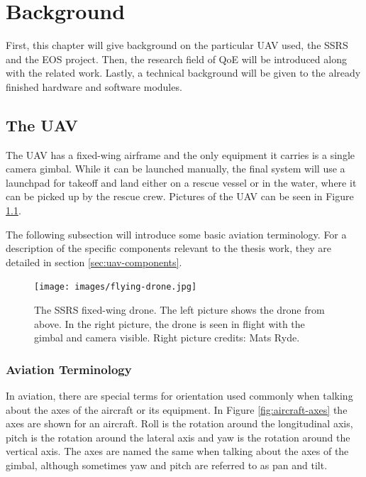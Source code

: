 \documentclass[nofilelist]{cslthse-msc}
\begin{document}
\chapter{Background}
First, this chapter will give background on the particular UAV used, the SSRS and the EOS project. Then, the research field of QoE will be introduced along with the related work. Lastly, a technical background will be given to the already finished hardware and software modules.  

\section{The UAV}
\label{sec:fixed-wing-uav}
The UAV has a fixed-wing airframe and the only equipment it carries is a single camera gimbal. While it can be launched manually, the final system will use a launchpad for takeoff and land either on a rescue vessel or in the water, where it can be picked up by the rescue crew. Pictures of the UAV can be seen in Figure \ref{fig:fv-drone-pics}. 

The following subsection will introduce some basic aviation terminology. For a description of the specific components relevant to the thesis work, they are detailed in section \ref{sec:uav-components}.

\begin{figure}[htp]
   \centering
   \texttt{[image: images/flying-drone.jpg]}
   \caption{The SSRS fixed-wing drone. The left picture shows the drone from above. In the right picture, the drone is seen in flight with the gimbal and camera visible. Right picture credits: Mats Ryde.}
   \label{fig:fv-drone-pics}
\end{figure}

\subsection{Aviation Terminology}
In aviation, there are special terms for orientation used commonly when talking about the axes of the aircraft or its equipment. In Figure \ref{fig:aircraft-axes} the axes are shown for an aircraft. Roll is the rotation around the longitudinal axis, pitch is the rotation around the lateral axis and yaw is the rotation around the vertical axis. The axes are named the same when talking about the axes of the gimbal, although sometimes yaw and pitch are referred to as pan and tilt.
\end{document}
